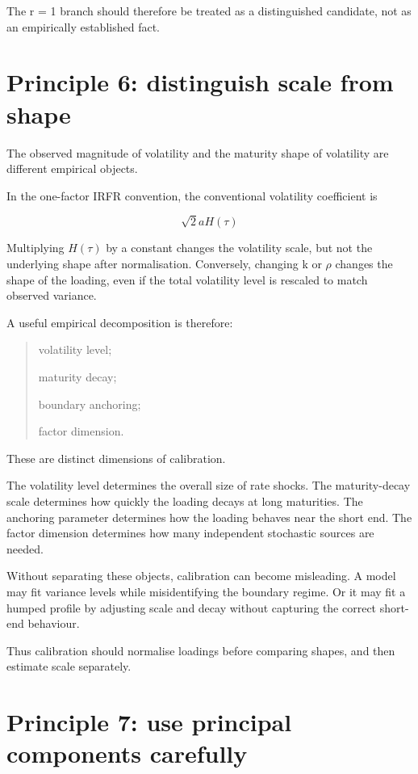 \documentclass[11pt,oneside]{book}
\begin{document}
The r = 1 branch should therefore be treated as a distinguished
candidate, not as an empirically established fact.

\section{Principle 6: distinguish scale from
shape}\label{principle-6-distinguish-scale-from-shape}

The observed magnitude of volatility and the maturity shape of
volatility are different empirical objects.

In the one-factor IRFR convention, the conventional volatility
coefficient is

\[
\sqrt{2} aH(\tau)
\]

Multiplying $H(\tau)$ by a constant changes the volatility scale, but not the
underlying shape after normalisation. Conversely, changing k or $\rho$
changes the shape of the loading, even if the total volatility level is
rescaled to match observed variance.

A useful empirical decomposition is therefore:

\begin{quote}
\item  volatility level;

\item  maturity decay;

\item  boundary anchoring;

\item  factor dimension.
\end{quote}

These are distinct dimensions of calibration.

The volatility level determines the overall size of rate shocks. The
maturity-decay scale determines how quickly the loading decays at long
maturities. The anchoring parameter determines how the loading behaves
near the short end. The factor dimension determines how many independent
stochastic sources are needed.

Without separating these objects, calibration can become misleading. A
model may fit variance levels while misidentifying the boundary regime.
Or it may fit a humped profile by adjusting scale and decay without
capturing the correct short-end behaviour.

Thus calibration should normalise loadings before comparing shapes, and
then estimate scale separately.

\section{Principle 7: use principal components
carefully}\label{principle-7-use-principal-components-carefully}
\end{document}
